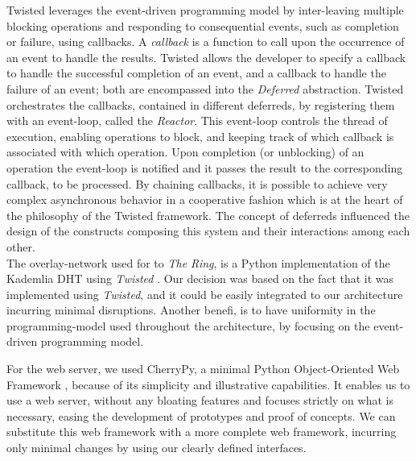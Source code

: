 \documentclass[12pt, titlepage]{uo_temp}
\begin{document}
     Twisted leverages the event-driven programming model by inter-leaving multiple
     blocking operations and responding to consequential events, such as completion or
     failure, using callbacks. A \emph{callback} is a function to call upon the occurrence
     of an event to handle the results. Twisted allows the developer to specify a callback
     to handle the successful completion of an event, and a callback to handle the failure
     of an event; both are encompassed into the \emph{Deferred} abstraction. Twisted
     orchestrates the callbacks, contained in different deferreds, by registering them
     with an event-loop, called the \emph{Reactor}. This event-loop controls the thread of
     execution, enabling operations to block, and keeping track of which callback is
     associated with which operation. Upon completion (or unblocking) of an operation the
     event-loop is notified and it passes the result to the corresponding callback, to
     be processed. By chaining callbacks, it is possible to achieve very complex asynchronous
     behavior in a cooperative fashion which is at the heart of the philosophy of the
     Twisted framework. 
     The concept of deferreds influenced the design of the constructs composing this
     system and their interactions among each other.\\


     The overlay-network used for to \emph{The Ring}, is a Python implementation of the
     Kademlia DHT using \emph{Twisted} \cite{kademlia_python}. Our decision was based on
     the fact that it was implemented using \emph{Twisted}, and it could be easily
     integrated to our architecture incurring minimal disruptions. Another benefi, is to
     have uniformity in the programming-model used throughout the architecture, by
     focusing on the event-driven programming model.

     For the web server, we used CherryPy, a minimal Python Object-Oriented Web Framework
     \cite{cherrypy}, because of its simplicity and illustrative capabilities. It enables
     us to use a web server, without any bloating features and focuses strictly on what is
     necessary, easing the development of prototypes and proof of concepts. We can
     substitute this web framework with a more complete web framework, incurring only
     minimal changes by using our clearly defined interfaces.
\end{document}
